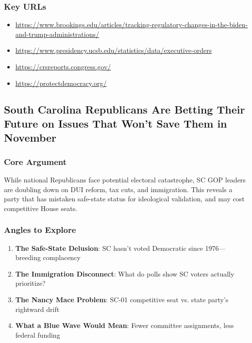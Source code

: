\documentclass[11pt,letterpaper]{article}
\begin{document}
\subsubsection*{Key URLs}
\begin{itemize}[noitemsep]
    \item \url{https://www.brookings.edu/articles/tracking-regulatory-changes-in-the-biden-and-trump-administrations/}
    \item \url{https://www.presidency.ucsb.edu/statistics/data/executive-orders}
    \item \url{https://crsreports.congress.gov/}
    \item \url{https://protectdemocracy.org/}
\end{itemize}

\newpage
\subsection{South Carolina Republicans Are Betting Their Future on Issues That Won't Save Them in November}

\subsubsection*{Core Argument}
While national Republicans face potential electoral catastrophe, SC GOP leaders are doubling down on DUI reform, tax cuts, and immigration. This reveals a party that has mistaken safe-state status for ideological validation, and may cost competitive House seats.

\subsubsection*{Angles to Explore}
\begin{enumerate}[noitemsep]
    \item \textbf{The Safe-State Delusion}: SC hasn't voted Democratic since 1976---breeding complacency
    \item \textbf{The Immigration Disconnect}: What do polls show SC voters actually prioritize?
    \item \textbf{The Nancy Mace Problem}: SC-01 competitive seat vs. state party's rightward drift
    \item \textbf{What a Blue Wave Would Mean}: Fewer committee assignments, less federal funding
\end{enumerate}
\end{document}
